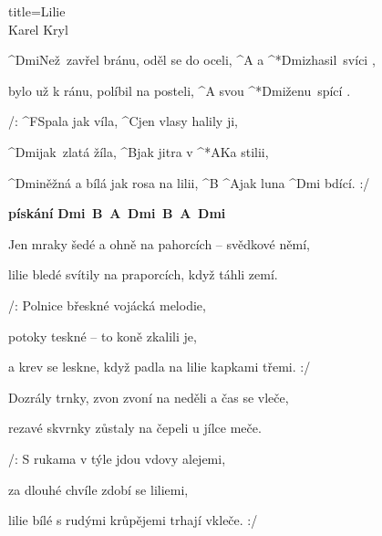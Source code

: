 \begin{song}{title=\predtitle\centering Lilie \\\large Karel Kryl  \vspace*{-0.3cm}}  %
\begin{centerjustified}
\nejnejvetsi

\sloka 
	^{Dmi\z}Než~zavřel bránu, oděl se do oceli, ^{A} a ^*{\z Dmi}zhasil~svíci ,  

	bylo už k ránu, políbil na posteli, ^{A} svou ^*{\z Dmi}ženu~spící . 

	/: ^{F\z}Spala jak víla, ^{C}jen vlasy halily ji, 
	
	^{Dmi\z}jak~zlatá žíla, ^{B}jak jitra v ^*{A}Ka stilii, 
	
	^{Dmi\z }něžná a bílá jak rosa na lilii, ^{B} ^{A}jak luna ^{Dmi \z}bdící. :/ 

\phantom{tom}

\textbf{pískání} \textbf{Dmi\, B\, A\, Dmi\, B\, A\, Dmi}

\sloka
	Jen mraky šedé a ohně na pahorcích -- svědkové němí, 
	
	lilie bledé svítily na praporcích, když táhli zemí.

	/: Polnice břeskné vojácká melodie, 

	potoky teskné -- to koně zkalili je, 
	
	a krev se leskne, když padla na lilie kapkami třemi. :/ 

\sloka
	Dozrály trnky, zvon zvoní na neděli a čas se vleče, 

	rezavé skvrnky zůstaly na čepeli u jílce meče.
	
	/: S rukama v týle jdou vdovy alejemi, 

	za dlouhé chvíle zdobí se liliemi, 
	
	lilie bílé s rudými krůpějemi trhají vkleče. :/  


\end{centerjustified}
\setcounter{Slokočet}{0}
\end{song}

